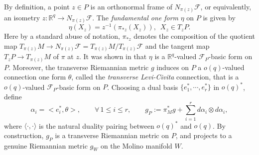 \documentclass[reqno, 11pt]{amsart}
\theoremstyle{definition}
\theoremstyle{property}
\theoremstyle{remark}
\numberwithin{equation}{section}
\begin{document}
 
By definition, a point $z\in P$ is an orthonormal frame of $N_{\pi(z)}\mathcal{F}$, or equivalently, an isometry $z: \mathbb{R}^q\rightarrow N_{\pi(z)}\mathcal{F}$. The \emph{fundamental one form}
$\eta$ on $P$ is given by
\begin{equation}\label{f-one-form} \eta (X_z)= z^{-1}( \pi_{*z}(X_z)), \, \, \, X_z\in T_zP.\end{equation} 
Here by a standard abuse of notation, $\pi_{*z}$ denotes the composition of the quotient map
$T_{\pi(z)}M\rightarrow N_{\pi(z)}\mathcal{F}=T_{\pi(z)}M/ T_{\pi(z)}\mathcal{F}$ and the
 tangent map $T_zP \rightarrow T_{\pi(z)}M$ of $\pi$ at $z$.  It was shown in \cite[Page 84]{Mo88} that $\eta$ is a $\mathbb{R}^q$-valued $\mathcal{F}_P$-basic form on $P$. Moreover, the transverse Riemannian metric $g$ induces on $P$ a $o(q)$-valued connection one form $\theta$, called the \emph{transverse Levi-Civita} connection, that is a $o(q)$-valued $\mathcal{F}_P$-basic form on $P$.
 Choosing a dual basis $\{e^*_1, \cdots, e^*_r\}$ in $o(q)^*$, define
 \begin{equation}\label{lifted-metric} \alpha_i=<e^*_i, \theta>,\qquad  \forall\, 1\leq i\leq r, \qquad \displaystyle g_P:=\pi_M^* g+ \sum_{i=1}^{r} d\alpha_i\otimes d\alpha_i,\end{equation}
where $\langle \cdot, \cdot\rangle$ is the natural duality pairing between $o(q)^*$ and $o(q)$. By construction, $g_P$ is a transverse Riemannian metric on $P$, and projects to a genuine Riemannian metric $g_W$ on the Molino manifold $W$. 
\end{document}
